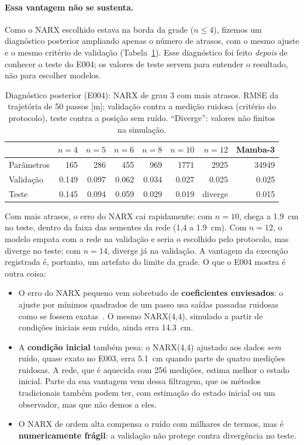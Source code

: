 \documentclass[11pt,a4paper]{article}
\begin{document}
\paragraph{Essa vantagem não se sustenta.} Como o NARX escolhido estava na borda da grade
($n\le4$), fizemos um diagnóstico posterior ampliando apenas o número de atrasos, com o mesmo ajuste
e o mesmo critério de validação (Tabela~\ref{tab:sensibilidade}). Esse diagnóstico foi feito
\emph{depois} de conhecer o teste do E004; os valores de teste servem para entender o resultado, não
para escolher modelos.

\begin{table}[ht]
\centering
\caption{Diagnóstico posterior (E004): NARX de grau 3 com mais atrasos. RMSE da trajetória de 50
passos [m]; validação contra a medição ruidosa (critério do protocolo), teste contra a posição sem
ruído. ``Diverge'': valores não finitos na simulação.}\label{tab:sensibilidade}
\small\setlength{\tabcolsep}{5pt}
\begin{tabular}{lrrrrrrr}
\toprule
 & $n=4$ & $n=5$ & $n=6$ & $n=8$ & $n=10$ & $n=12$ & Mamba-3 \\
\midrule
Parâmetros & 165 & 286 & 455 & 969 & \num{1771} & \num{2925} & \num{34949} \\
Validação & \num{0.149} & \num{0.097} & \num{0.062} & \num{0.034} & \num{0.027} & \num{0.025} & \num{0.025} \\
Teste & \num{0.145} & \num{0.094} & \num{0.059} & \num{0.029} & \num{0.019} & diverge & \num{0.015} \\
\bottomrule
\end{tabular}
\end{table}

Com mais atrasos, o erro do NARX cai rapidamente: com $n=10$, chega a \SI{1,9}{cm} no teste,
dentro da faixa das sementes da rede (1,4 a \SI{1,9}{cm}). Com $n=12$, o modelo empata com a rede
na validação e seria o escolhido pelo protocolo, mas diverge no teste; com $n=14$, diverge já na
validação. A vantagem da execução registrada é, portanto, um artefato do limite da
grade. O que o E004 mostra é outra coisa:
\begin{itemize}\itemsep0pt
  \item O erro do NARX pequeno vem sobretudo de \textbf{coeficientes enviesados}: o ajuste por mínimos
  quadrados de um passo usa saídas passadas ruidosas como se fossem exatas~\cite{ljung1999,
  billings2013}. O mesmo NARX(4,4), simulado a partir de condições iniciais sem ruído, ainda erra
  \SI{14,3}{cm}.
  \item A \textbf{condição inicial} também pesa: o NARX(4,4) ajustado aos dados \emph{sem} ruído,
  quase exato no E003, erra \SI{5,1}{cm} quando parte de quatro medições ruidosas. A rede, que é
  aquecida com 256 medições, estima melhor o estado inicial. Parte da sua vantagem vem dessa
  filtragem, que os métodos tradicionais também podem ter, com estimação do estado inicial ou um
  observador, mas que não demos a eles.
  \item O NARX de ordem alta compensa o ruído com milhares de termos, mas é \textbf{numericamente
  frágil}: a validação não protege contra divergência no teste.
\end{itemize}
\end{document}
